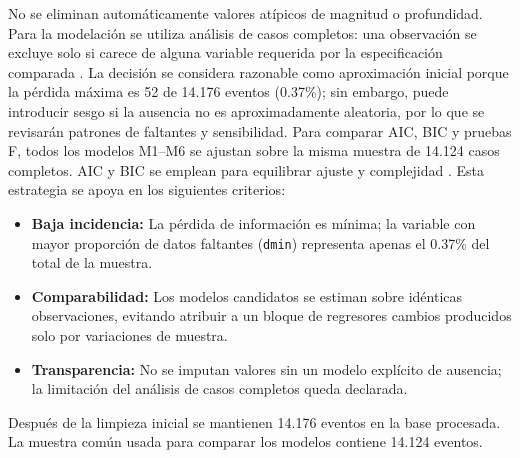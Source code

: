 \documentclass{style}
\newcommand{\var}[1]{\texttt{#1}}
\newcommand{\reporttablesize}{\footnotesize}
\begin{document}
No se eliminan automáticamente valores atípicos de magnitud o profundidad. Para la modelación se utiliza análisis de casos completos: una observación se excluye solo si carece de alguna variable requerida por la especificación comparada \cite{littleRubin2019}. La decisión se considera razonable como aproximación inicial porque la pérdida máxima es 52 de 14.176 eventos (0.37\%); sin embargo, puede introducir sesgo si la ausencia no es aproximadamente aleatoria, por lo que se revisarán patrones de faltantes y sensibilidad. Para comparar AIC, BIC y pruebas F, todos los modelos M1--M6 se ajustan sobre la misma muestra de 14.124 casos completos. AIC y BIC se emplean para equilibrar ajuste y complejidad \cite{akaike1974,schwarz1978}.
Esta estrategia se apoya en los siguientes criterios:
\begin{itemize}
    \item \textbf{Baja incidencia:} La pérdida de información es mínima; la variable con mayor proporción de datos faltantes (\var{dmin}) representa apenas el 0.37\% del total de la muestra.
    \item \textbf{Comparabilidad:} Los modelos candidatos se estiman sobre idénticas observaciones, evitando atribuir a un bloque de regresores cambios producidos solo por variaciones de muestra.
    \item \textbf{Transparencia:} No se imputan valores sin un modelo explícito de ausencia; la limitación del análisis de casos completos queda declarada.
\end{itemize}



Después de la limpieza inicial se mantienen 14.176 eventos en la base procesada. La muestra común usada para comparar los modelos contiene 14.124 eventos.

\end{document}
